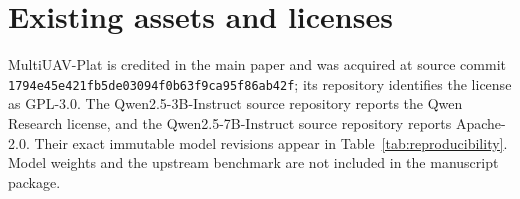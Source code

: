 \documentclass{article}
\begin{document}
\section{Existing assets and licenses}
\label{app:assets}

MultiUAV-Plat is credited in the main paper and was acquired at source commit
\texttt{1794e45e421fb5de03094f0b63f9ca95f86ab42f}; its repository identifies
the license as GPL-3.0. The Qwen2.5-3B-Instruct source repository reports the
Qwen Research license, and the Qwen2.5-7B-Instruct source repository reports
Apache-2.0. Their exact immutable model revisions appear in
Table~\ref{tab:reproducibility}. Model weights and the upstream benchmark are
not included in the manuscript package.

\ifdefined\ShepherdOmitChecklist
\else
  
\fi
\end{document}
